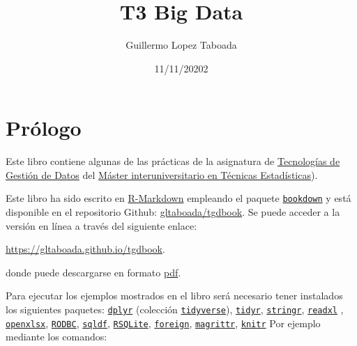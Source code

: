 \documentclass[
]{book}
\title{T3 Big Data}
\author{Guillermo Lopez Taboada}
\date{11/11/20202}
\begin{document}
\maketitle

{
\setcounter{tocdepth}{1}
\tableofcontents
}
\chapter*{Prólogo}\label{pruxf3logo}

Este libro contiene algunas de las prácticas de la asignatura de \href{http://eamo.usc.es/pub/mte/index.php/es/?option=com_content&view=article&id=2202&idm=38&a\%C3\%B1o=2020}{Tecnologías de Gestión de Datos} del \href{http://eio.usc.es/pub/mte}{Máster interuniversitario en Técnicas Estadísticas}).

Este libro ha sido escrito en \href{http://rmarkdown.rstudio.com}{R-Markdown} empleando el paquete \href{https://bookdown.org/yihui/bookdown/}{\texttt{bookdown}} y está disponible en el repositorio Github: \href{https://github.com/gltaboada/tgdbook}{gltaboada/tgdbook}.
Se puede acceder a la versión en línea a través del siguiente enlace:

\url{https://gltaboada.github.io/tgdbook}.

donde puede descargarse en formato \href{https://gltaboada.github.io/tgdbook/Practicas_de_TGD.pdf}{pdf}.

Para ejecutar los ejemplos mostrados en el libro será necesario tener instalados los siguientes paquetes:
\href{https://dplyr.tidyverse.org}{\texttt{dplyr}} (colección \href{https://www.tidyverse.org/}{\texttt{tidyverse}}),
\href{https://tidyr.tidyverse.org}{\texttt{tidyr}},
\href{https://stringr.tidyverse.org}{\texttt{stringr}},
\href{https://readxl.tidyverse.org}{\texttt{readxl}} ,
\href{https://cran.r-project.org/web/packages/openxlsx/index.html}{\texttt{openxlsx}}, \href{https://cran.r-project.org/web/packages/RODBC/index.html}{\texttt{RODBC}},
\href{https://cran.r-project.org/web/packages/sqldf/index.html}{\texttt{sqldf}},
\href{https://r-dbi.github.io/RSQLite}{\texttt{RSQLite}},
\href{https://cran.r-project.org/web/packages/foreign/index.html}{\texttt{foreign}},
\href{https://cran.r-project.org/web/packages/magrittr/index.html}{\texttt{magrittr}},
\href{https://yihui.name/knitr}{\texttt{knitr}}
Por ejemplo mediante los comandos:
\end{document}
